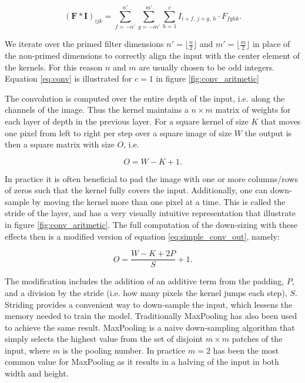 \begin{equation}\label{eq:conv}
(\mathbf{F}*\mathbf{I})_{ijk} = 
\sum_{f=-n'}^{n'}\sum_{g=-m'}^{m'}\sum_{h=1} ^c
I_{i+f,\, j+g,\, h}\cdot F_{fghk}.
\end{equation}

\noindent We iterate over the primed filter dimensions $n'=\lfloor\frac{n}{2} \rfloor$ and $m' = \lfloor \frac{m}{2} \rfloor$ in place of the non-primed dimensions to correctly align the input with the center element of the kernels. For this reason $n$ and $m$ are usually chosen to be odd integers. Equation \ref{eq:conv} is illustrated for $c=1$ in figure \ref{fig:conv_aritmetic}   

The convolution is computed over the entire depth of the input, i.e. along the channels of the image. Thus the kernel maintains a $n\times m$ matrix of weights for each layer of depth in the previous layer. For a square kernel of size $K$ that moves one pixel from left to right per step over a square image of size $W$ the output is then a square matrix with size $O$, i.e.

\begin{equation}\label{eq:simple_conv_out}
O = W - K +1.
\end{equation}

\noindent In practice it is often beneficial to pad the image with one or more columns/rows of zeros such that the kernel fully covers the input. Additionally, one can down-sample by moving the kernel more than one pixel at a time. This is called the stride of the layer, and has a very visually intuitive representation that illustrate in figure \ref{fig:conv_aritmetic}. The full computation of the down-sizing with these effects then is a modified version of equation \ref{eq:simple_conv_out}, namely: 

\begin{equation}\label{eq:conv_out}
O = \frac{W - K + 2P}{S} + 1.
\end{equation} 

\noindent The modification includes the addition of an additive term from the padding, $P$, and a division by the stride (i.e. how many pixels the kernel jumps each step), $S$. Striding provides a convenient way to down-sample the input, which lessens the memory needed to train the model. Traditionally MaxPooling has also been used to achieve the same result. MaxPooling is a naive down-sampling algorithm that simply selects the highest value from the set of disjoint $m\times m$ patches of the input, where $m$ is the pooling number. In practice $m=2$ has been the most common value for MaxPooling as it results in a halving of the input in both width and height.

